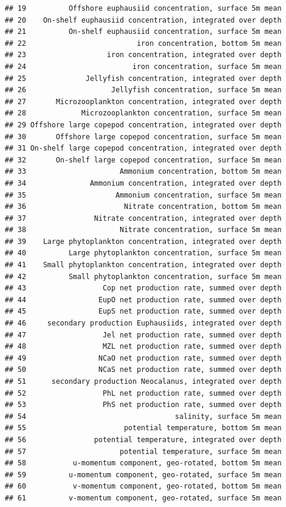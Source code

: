 \documentclass[
]{article}
\begin{document}
\begin{verbatim}
## 19          Offshore euphausiid concentration, surface 5m mean
## 20    On-shelf euphausiid concentration, integrated over depth
## 21          On-shelf euphausiid concentration, surface 5m mean
## 22                          iron concentration, bottom 5m mean
## 23                   iron concentration, integrated over depth
## 24                         iron concentration, surface 5m mean
## 25              Jellyfish concentration, integrated over depth
## 26                    Jellyfish concentration, surface 5m mean
## 27       Microzooplankton concentration, integrated over depth
## 28             Microzooplankton concentration, surface 5m mean
## 29 Offshore large copepod concentration, integrated over depth
## 30       Offshore large copepod concentration, surface 5m mean
## 31 On-shelf large copepod concentration, integrated over depth
## 32       On-shelf large copepod concentration, surface 5m mean
## 33                      Ammonium concentration, bottom 5m mean
## 34               Ammonium concentration, integrated over depth
## 35                     Ammonium concentration, surface 5m mean
## 36                       Nitrate concentration, bottom 5m mean
## 37                Nitrate concentration, integrated over depth
## 38                      Nitrate concentration, surface 5m mean
## 39    Large phytoplankton concentration, integrated over depth
## 40          Large phytoplankton concentration, surface 5m mean
## 41    Small phytoplankton concentration, integrated over depth
## 42          Small phytoplankton concentration, surface 5m mean
## 43                  Cop net production rate, summed over depth
## 44                 EupO net production rate, summed over depth
## 45                 EupS net production rate, summed over depth
## 46     secondary production Euphausiids, integrated over depth
## 47                  Jel net production rate, summed over depth
## 48                  MZL net production rate, summed over depth
## 49                 NCaO net production rate, summed over depth
## 50                 NCaS net production rate, summed over depth
## 51      secondary production Neocalanus, integrated over depth
## 52                  PhL net production rate, summed over depth
## 53                  PhS net production rate, summed over depth
## 54                                   salinity, surface 5m mean
## 55                       potential temperature, bottom 5m mean
## 56                potential temperature, integrated over depth
## 57                      potential temperature, surface 5m mean
## 58           u-momentum component, geo-rotated, bottom 5m mean
## 59          u-momentum component, geo-rotated, surface 5m mean
## 60           v-momentum component, geo-rotated, bottom 5m mean
## 61          v-momentum component, geo-rotated, surface 5m mean
\end{verbatim}
\end{document}
